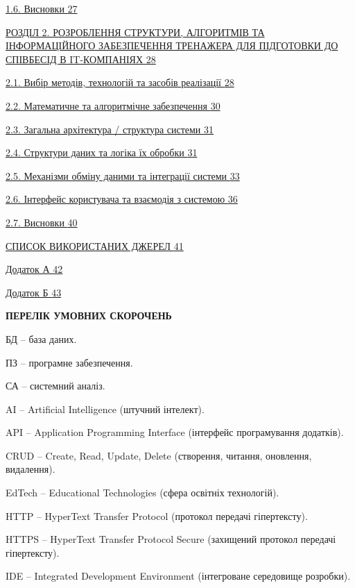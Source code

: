 \documentclass[
]{article}
\begin{document}
\hyperref[_Toc228981057]{1.6. Висновки \hyperref[_Toc228981057]{27}}

\hyperref[_Toc228981058]{РОЗДІЛ 2. РОЗРОБЛЕННЯ СТРУКТУРИ, АЛГОРИТМІВ ТА
ІНФОРМАЦІЙНОГО ЗАБЕЗПЕЧЕННЯ ТРЕНАЖЕРА ДЛЯ ПІДГОТОВКИ ДО СПІВБЕСІД В
IT-КОМПАНІЯХ \hyperref[_Toc228981058]{28}}

\hyperref[_Toc228981059]{2.1. Вибір методів, технологій та засобів
реалізації \hyperref[_Toc228981059]{28}}

\hyperref[_Toc228981060]{2.2. Математичне та алгоритмічне забезпечення
\hyperref[_Toc228981060]{30}}

\hyperref[_Toc228981061]{2.3. Загальна архітектура / структура системи
\hyperref[_Toc228981061]{31}}

\hyperref[_Toc228981062]{2.4. Структури даних та логіка їх обробки
\hyperref[_Toc228981062]{31}}

\hyperref[_Toc228981063]{2.5. Механізми обміну даними та інтеграції
системи \hyperref[_Toc228981063]{33}}

\hyperref[_Toc228981064]{2.6. Інтерфейс користувача та взаємодія з
системою \hyperref[_Toc228981064]{36}}

\hyperref[_Toc228981065]{2.7. Висновки \hyperref[_Toc228981065]{40}}

\hyperref[_Toc228981066]{СПИСОК ВИКОРИСТАНИХ ДЖЕРЕЛ
\hyperref[_Toc228981066]{41}}

\hyperref[_Toc228981067]{Додаток А \hyperref[_Toc228981067]{42}}

\hyperref[_Toc228981068]{Додаток Б \hyperref[_Toc228981068]{43}}

\textbf{ПЕРЕЛІК УМОВНИХ СКОРОЧЕНЬ}

БД -- база даних.

ПЗ -- програмне забезпечення.

СА -- системний аналіз.

AI -- Artificial Intelligence (штучний інтелект).

API -- Application Programming Interface (інтерфейс програмування
додатків).

CRUD -- Create, Read, Update, Delete (створення, читання, оновлення,
видалення).

EdTech -- Educational Technologies (сфера освітніх технологій).

HTTP -- HyperText Transfer Protocol (протокол передачі гіпертексту).

HTTPS -- HyperText Transfer Protocol Secure (захищений протокол передачі
гіпертексту).

IDE -- Integrated Development Environment (інтегроване середовище
розробки).
\end{document}
